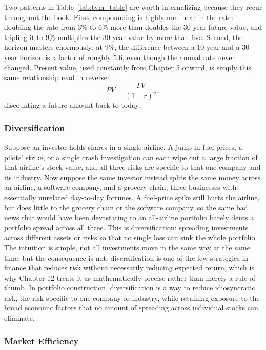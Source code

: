 \documentclass[../ai_in_finance]{subfiles}
\begin{document}
Two patterns in Table~\ref{tab:tvm_table} are worth internalizing because they recur throughout the book. First, compounding is highly nonlinear in the rate: doubling the rate from 3\% to 6\% more than doubles the 30-year future value, and tripling it to 9\% multiplies the 30-year value by more than five. Second, the horizon matters enormously: at 9\%, the difference between a 10-year and a 30-year horizon is a factor of roughly 5.6, even though the annual rate never changed. Present value, used constantly from Chapter 5 onward, is simply this same relationship read in reverse:
$$PV = \frac{FV}{(1+r)^n},$$
discounting a future amount back to today.

\subsubsection*{Diversification}

Suppose an investor holds shares in a single airline. A jump in fuel prices, a pilots' strike, or a single crash investigation can each wipe out a large fraction of that airline's stock value, and all three risks are specific to that one company and its industry. Now suppose the same investor instead splits the same money across an airline, a software company, and a grocery chain, three businesses with essentially unrelated day-to-day fortunes. A fuel-price spike still hurts the airline, but does little to the grocery chain or the software company, so the same bad news that would have been devastating to an all-airline portfolio barely dents a portfolio spread across all three.
This is diversification: spreading investments across different assets or risks so that no single loss can sink the whole portfolio. The intuition is simple, not all investments move in the same way at the same time, but the consequence is not: diversification is one of the few strategies in finance that reduces risk without necessarily reducing expected return, which is why Chapter 12 treats it as mathematically precise rather than merely a rule of thumb. In portfolio construction, diversification is a way to reduce idiosyncratic risk, the risk specific to one company or industry, while retaining exposure to the broad economic factors that no amount of spreading across individual stocks can eliminate.

\subsubsection*{Market Efficiency}
\end{document}
